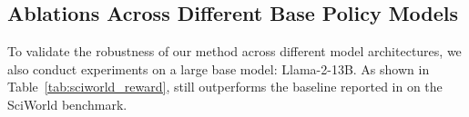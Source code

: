 \subsection{Ablations Across Different Base Policy Models}
To validate the robustness of our method across different model architectures, we also conduct experiments on a large base model: Llama-2-13B. As shown in Table~\ref{tab:sciworld_reward}, {\ours} still outperforms the baseline reported in \citet{song-etal-2024-eto} on the SciWorld benchmark.